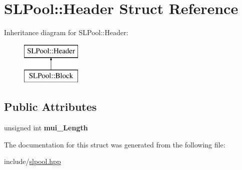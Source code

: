 \hypertarget{struct_s_l_pool_1_1_header}{}\section{S\+L\+Pool\+:\+:Header Struct Reference}
\label{struct_s_l_pool_1_1_header}
Inheritance diagram for S\+L\+Pool\+:\+:Header\+:\begin{figure}[H]
\begin{center}
\leavevmode
\includegraphics[height=2.000000cm]{struct_s_l_pool_1_1_header}
\end{center}
\end{figure}
\subsection*{Public Attributes}
\begin{DoxyCompactItemize}
\item 
unsigned int {\bfseries mui\+\_\+\+Length}\hypertarget{struct_s_l_pool_1_1_header_a0c06e96d58fa921e35411833364ad264}{}\label{struct_s_l_pool_1_1_header_a0c06e96d58fa921e35411833364ad264}

\end{DoxyCompactItemize}


The documentation for this struct was generated from the following file\+:\begin{DoxyCompactItemize}
\item 
include/\hyperlink{slpool_8hpp}{slpool.\+hpp}\end{DoxyCompactItemize}
